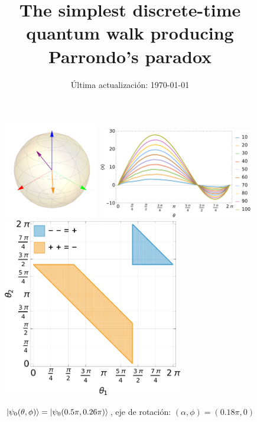 \documentclass[10pt,letterpaper]{article} %
\title{The simplest discrete-time quantum walk producing Parrondo's paradox}
\author{}
\date{Última actualización: \today}
\begin{document}
\maketitle

\begin{figure}
\centering
\includegraphics[width=0.37\textwidth]{figs/fixed_rotation_axes_bloch_sphere_01.pdf}
\includegraphics[width=0.6\textwidth]{figs/fixed_rotation_axes_expval_01.pdf}
\includegraphics[width=0.7\textwidth]{figs/fixed_rotation_axes_01.pdf}
\caption{$\ket{\psi_0(\theta,\phi)} = \ket{\psi_0(0.5\pi, 0.26\pi)}$, 
eje de rotación: $(\alpha, \phi) = (0.18\pi, 0)$}
\end{figure}

% 



\end{document}
